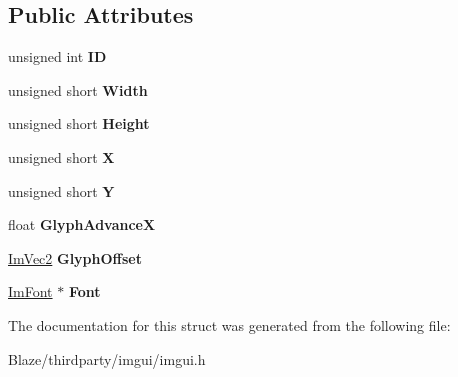\subsection*{Public Attributes}
\begin{DoxyCompactItemize}
\item 
\mbox{\label{structImFontAtlasCustomRect_af33c743d2a71878c8adc27f4dce826fd}} 
unsigned int {\bfseries ID}
\item 
\mbox{\label{structImFontAtlasCustomRect_ada0c5ae3700d9074280c0801dd9ae20e}} 
unsigned short {\bfseries Width}
\item 
\mbox{\label{structImFontAtlasCustomRect_a94a6da45f46f0cc5abfd6580abfb2f0c}} 
unsigned short {\bfseries Height}
\item 
\mbox{\label{structImFontAtlasCustomRect_a4e653e0c1855c48c4fc0b830ed696aed}} 
unsigned short {\bfseries X}
\item 
\mbox{\label{structImFontAtlasCustomRect_adda5fb1f5bfeb194bd5fc27b635db338}} 
unsigned short {\bfseries Y}
\item 
\mbox{\label{structImFontAtlasCustomRect_a062a08fee260f08e669231e602682617}} 
float {\bfseries Glyph\+AdvanceX}
\item 
\mbox{\label{structImFontAtlasCustomRect_a03f4d8c267b53dd7981560b0fb5b8b03}} 
\hyperlink{structImVec2}{Im\+Vec2} {\bfseries Glyph\+Offset}
\item 
\mbox{\label{structImFontAtlasCustomRect_ae0b05bcab100beb72c96c4a606c61b3a}} 
\hyperlink{structImFont}{Im\+Font} $\ast$ {\bfseries Font}
\end{DoxyCompactItemize}


The documentation for this struct was generated from the following file\+:\begin{DoxyCompactItemize}
\item 
Blaze/thirdparty/imgui/imgui.\+h\end{DoxyCompactItemize}
